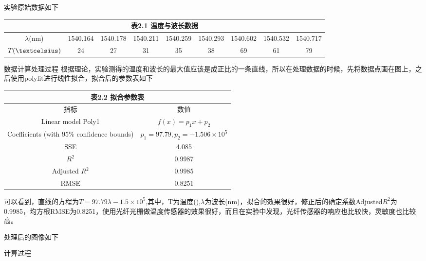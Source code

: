 \documentclass{zjureport}
\begin{document}
   \begin{clause}
   	\item 实验原始数据如下
   	\begin{center}
   		\begin{tabular}{|c|c|c|c|c|c|c|c|c|}
   			\multicolumn{9}{c}{表2.1 温度与波长数据}\\\hline
   			$\lambda$(nm)&1540.164&	1540.178&1540.211&	1540.259&	1540.293&	1540.602&1540.532&1540.717\\\hline
   			$T(\textcelsius)$&24&27&31&35&38&69&61&79\\\hline
   		\end{tabular}
   	\end{center}
   	\item 数据计算处理过程
   		根据理论，实验测得的温度和波长的最大值应该是成正比的一条直线，所以在处理数据的时候，先将数据点画在图上，之后使用polyfit进行线性拟合，拟合后的参数表如下
   		\begin{center}
   			 \begin{tabular}{|c|c|}
   			 	\multicolumn{2}{c}{表2.2 拟合参数表}\\\hline
   				{指标}	&	{数值}\\\hline
   				{Linear model Poly1}&{$f(x) = p_{1}x + p_{2}$}\\\hline
   				{Coefficients (with 95\% confidence bounds)}&
   				{$p_{1}=97.79,p_{2} =-1.506\times 10^{5}$}\\\hline
   				{SSE}&{4.085}\\\hline
   				{$R^{2}$}&{0.9987}\\\hline
   				{Adjusted $R^{2}$}&{0.9985}\\\hline
   				{RMSE}&{0.8251}\\\hline
   			\end{tabular}
   		\end{center}
 		可以看到，直线的方程为$T=97.79\lambda-1.5\times 10^{5}$,其中，T为温度(\textcelsius),$\lambda$为波长(nm)，拟合的效果很好，修正后的确定系数Adjusted$R^{2}$为0.9985，均方根RMSE为0.8251，使用光纤光栅做温度传感器的效果很好，而且在实验中发现，光纤传感器的响应也比较快，灵敏度也比较高。

   	\item 处理后的图像如下
   \item 计算过程
   

\end{clause}
\end{document}
